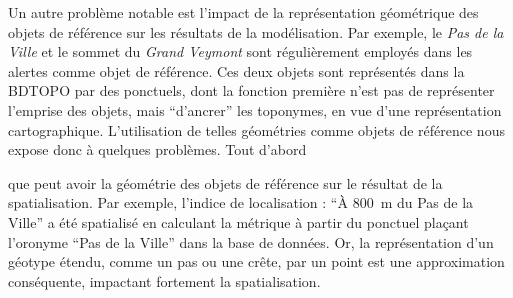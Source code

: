 
Un autre problème notable est l'impact de la représentation
géométrique des objets de référence sur les résultats de la
modélisation. Par exemple, le \emph{Pas de la Ville} et le sommet du
\emph{Grand Veymont} sont régulièrement employés dans les alertes
comme objet de référence. Ces deux objets sont représentés dans la
BDTOPO par des ponctuels, dont la fonction première n'est pas de
représenter l'emprise des objets, mais \enquote{d'ancrer} les
toponymes, en vue d'une représentation cartographique. L'utilisation
de telles géométries comme objets de référence nous expose donc à
quelques problèmes.
%
Tout d'abord


que peut avoir la géométrie des
objets de référence sur le résultat de la spatialisation. Par exemple,
l'indice de localisation : \enquote{À \SI{800}{\meter} du Pas de la
  Ville} a été spatialisé en calculant la métrique
 à partir du ponctuel plaçant l'oronyme
\enquote{Pas de la Ville} dans la base de données. Or, la
représentation d'un géotype étendu, comme un pas ou une crête, par un
point est une approximation conséquente, impactant fortement la
spatialisation.

